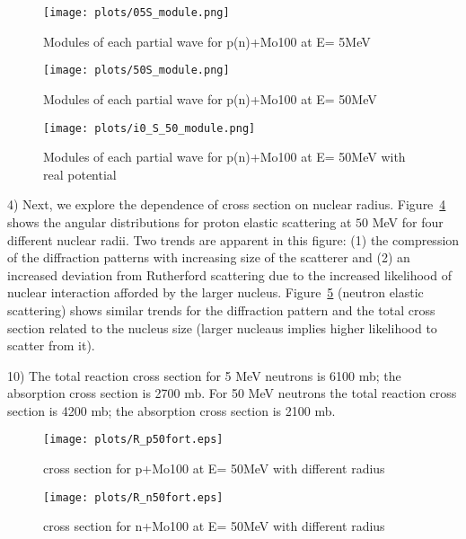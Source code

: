 \documentclass[]{scrartcl}
\begin{document}
\begin{sidewaysfigure}
	\begin{subfigure}{0.5\textwidth}
		\centering
		\texttt{[image: plots/05S\_module.png]}
		\caption{Modules of each partial wave for p(n)+Mo100 at E= 5MeV}
		\label{fig:modpn5}
	\end{subfigure}\quad
	\begin{subfigure}{0.5\textwidth}
	\centering
		\texttt{[image: plots/50S\_module.png]}
		\caption{Modules of each partial wave for p(n)+Mo100 at E= 50MeV}
		\label{fig:modpn50}
	\end{subfigure}

	\begin{subfigure}{0.5\textwidth}
	\centering
		\texttt{[image: plots/i0\_S\_50\_module.png]}
		\caption{Modules of each partial wave for p(n)+Mo100 at E= 50MeV with real potential}
		\label{fig:modnoimg}
	\end{subfigure}
\end{sidewaysfigure}


4) Next, we explore the dependence of cross section on nuclear radius. Figure~\ref{fig:radiusp} shows the angular distributions for proton elastic scattering at $50$ MeV for four different nuclear radii. Two trends are apparent in this figure: (1) the compression of the diffraction patterns with increasing size of the scatterer and (2) an increased deviation from Rutherford scattering due to the increased likelihood of nuclear interaction afforded by the larger nucleus. Figure~\ref{fig:radiusn} (neutron elastic scattering) shows similar trends for the diffraction pattern and the total cross section related to the nucleus size (larger nucleaus implies higher likelihood to scatter from it).

10) The total reaction cross section for 5 MeV neutrons is 6100 mb; the absorption cross section is 2700 mb. For 50 MeV neutrons the total reaction cross section is 4200 mb; the absorption cross section is 2100 mb.

\begin{figure}[h]
\centering
	\texttt{[image: plots/R\_p50fort.eps]}
	\caption{cross section for p+Mo100 at E= 50MeV with different radius}
	\label{fig:radiusp}
\end{figure}

\begin{figure}
\centering
	\texttt{[image: plots/R\_n50fort.eps]}
	\caption{cross section for n+Mo100 at E= 50MeV with different radius}
	\label{fig:radiusn}
\end{figure}
\end{document}
